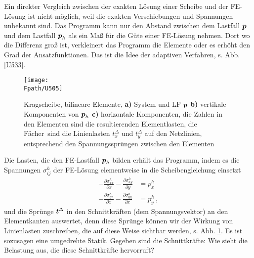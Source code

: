 {{Ein direkter Vergleich zwischen der exakten L\"{o}sung einer Scheibe und der FE-L\"{o}sung ist nicht m\"{o}glich, weil die exakten Verschiebungen und Spannungen unbekannt sind. Das Programm kann nur den Abstand zwischen dem Lastfall $\mbox{\boldmath $p$}$ und dem Lastfall $\mbox{\boldmath $p$}_h$ als ein Ma{\ss} f\"{u}r die G\"{u}te einer FE-L\"{o}sung nehmen. Dort wo die Differenz gro{\ss} ist, verkleinert das Programm die Elemente oder es erh\"{o}ht den Grad der Ansatzfunktionen. Das ist die Idee der adaptiven Verfahren, s. Abb. \ref{U533}.
\begin{figure}[h]
\if {} \sidecaption \fi
\texttt{[image: \\Fpath/U505]}
\caption{Kragscheibe, bilineare Elemente, {\bf a)}
System und LF $\mbox{\boldmath $p$}$ {\bf b)} vertikale Komponenten von $\mbox{\boldmath $p$}_h$ {\bf c)} horizontale
Komponenten, die Zahlen in den Elementen sind die resultierenden
Elementlasten, die \glq F\"{a}cher\grq\ sind die Linienlasten $t^\Delta_x$ und $t^\Delta_y$ auf den Netzlinien, entsprechend den Spannungsspr\"{u}ngen zwischen den Elementen }\label{U505}
\end{figure}

Die Lasten, die den FE-Lastfall $\mbox{\boldmath $p$}_h$ bilden erh\"{a}lt das Programm, indem es die Spannungen $\sigma_{ij}^h$ der FE-L\"{o}sung elementweise in die Scheibengleichung einsetzt
\begin{subequations}
\begin{align}
-\frac{\partial \sigma_{xx}^h }{\partial x} - \frac{\partial \sigma_{xy}^h }{\partial y} &= p_x^h\\
- \frac{\partial \sigma_{yx}^h }{\partial x} - \frac{\partial \sigma_{yy}^h }{\partial x}  &= p_y^h \,,
\end{align}
\end{subequations}
und die Spr\"{u}nge $\mbox{\boldmath $t$}^{\Delta}$ in den Schnittkr\"{a}ften (dem Spannungsvektor) an den Elementkanten auswertet, denn diese Spr\"{u}nge k\"{o}nnen wir der Wirkung von Linienlasten zuschreiben, die auf diese Weise sichtbar werden, s. Abb. \ref{U505}. Es ist sozusagen eine umgedrehte Statik. Gegeben sind die Schnittkr\"{a}fte: Wie sieht die Belastung aus, die diese Schnittkr\"{a}fte hervorruft?

}}
